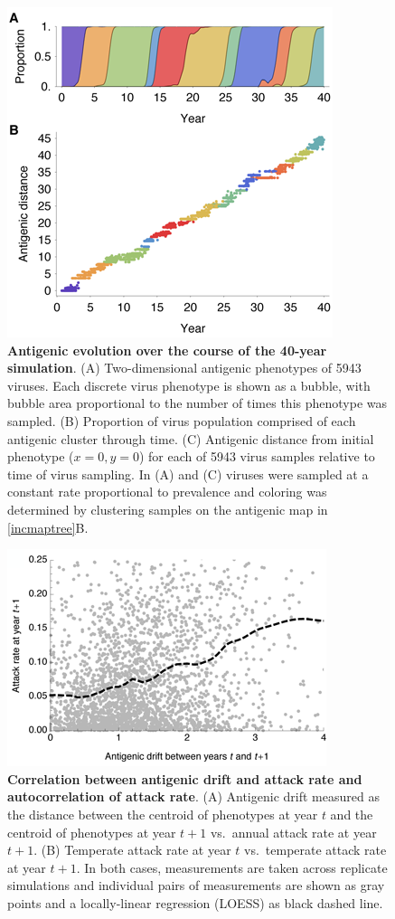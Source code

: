 \pagebreak

\begin{figure}[H]
	\centering
	\includegraphics{figures/phenotypes}
	\caption{\textbf{Antigenic evolution over the course of the 40-year simulation}. (A) Two-dimensional antigenic phenotypes of 5943 viruses.  Each discrete virus phenotype is shown as a bubble, with bubble area proportional to the number of times this phenotype was sampled. (B) Proportion of virus population comprised of each antigenic cluster through time.  (C) Antigenic distance from initial phenotype ($x=0,y=0$) for each of 5943 virus samples relative to time of virus sampling. In (A) and (C) viruses were sampled at a constant rate proportional to prevalence and coloring was determined by clustering samples on the antigenic map in \ref{incmaptree}B.}
	\label{phenotypes}
\end{figure}

\pagebreak

\begin{figure}[!c]
	\centering
	\includegraphics{figures/driftvsinc}
	\caption{\textbf{Correlation between antigenic drift and attack rate and autocorrelation of attack rate}. (A) Antigenic drift measured as the distance between the centroid of phenotypes at year $t$ and the centroid of phenotypes at year $t+1$ vs.\ annual attack rate at year $t+1$. (B) Temperate attack rate at year $t$ vs.\ temperate attack rate at year $t+1$. In both cases, measurements are taken across replicate simulations and individual pairs of measurements are shown as gray points and a locally-linear regression (LOESS) as black dashed line.}
	\label{driftvsinc}
\end{figure}

